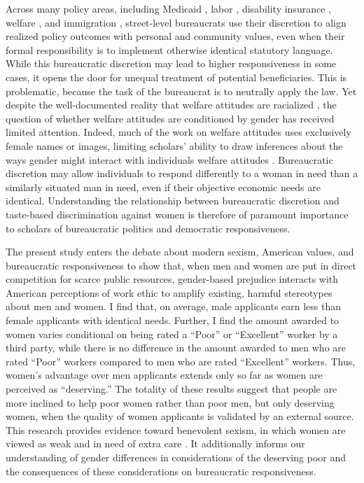 \documentclass[12pt]{article}%
\begin{document}
\begin{doublespace}

Across many policy areas, including Medicaid \citep{weissert1994beyond}, labor \citep{schmidt2002politicization}, disability insurance \citep{keiser1999state}, welfare \citep{kogan_welfare_2021}, and immigration \citep{lewis2013some}, street-level bureaucrats use their discretion to align realized policy outcomes with personal and community values, even when their formal responsibility is to implement otherwise identical statutory language. While this bureaucratic discretion may lead to higher responsiveness in some cases, it opens the door for unequal treatment of potential beneficiaries. This is problematic, because the task of the bureaucrat is to neutrally apply the law. Yet despite the well-documented reality that welfare attitudes are racialized \citep{desante_working_2013, gilliam_welfare_1999}, the question of whether welfare attitudes are conditioned by gender has received limited attention. Indeed, much of the work on welfare attitudes uses exclusively female names or images, limiting scholars' ability to draw inferences about the ways gender might interact with individuals welfare attitudes \citep{desante_working_2013, winter_beyond_2006, gilliam_welfare_1999, goren_pliable_2022}. Bureaucratic discretion may allow individuals to respond differently to a woman in need than a similarly situated man in need, even if their objective economic needs are identical.  Understanding the relationship between bureaucratic discretion and taste-based discrimination against women is therefore of paramount importance to scholars of bureaucratic politics and democratic responsiveness.

The present study enters the debate about modern sexism, American values, and bureaucratic responsiveness to show that, when men and women are put in direct competition for scarce public resources, gender-based prejudice interacts with American perceptions of work ethic to amplify existing, harmful stereotypes about men and women. I find that, on average, male applicants earn less than female applicants with identical needs. Further, I find the amount awarded to women varies conditional on being rated a ``Poor” or ``Excellent” worker by a third party, while there is no difference in the amount awarded to men who are rated ``Poor” workers compared to men who are rated ``Excellent” workers. Thus, women’s advantage over men applicants extends only so far as women are perceived as ``deserving.” The totality of these results suggest that people are more inclined to help poor women rather than poor men, but only deserving women, when the quality of women applicants is validated by an external source. This research provides evidence toward benevolent sexism, in which women are viewed as weak and in need of extra care \citep{glick_hostile_1997, glick_ambivalent_2001}. It additionally informs our understanding of gender differences in considerations of the deserving poor and the consequences of these considerations on bureaucratic responsiveness.


\end{doublespace}
\end{document}
